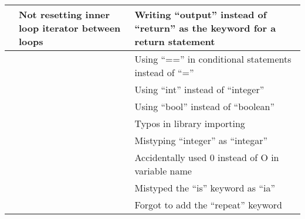 \begin{table}[]
\begin{tabular}{| p{5cm} | p{5cm} | p{5cm} |}
                                                           & Not resetting inner loop iterator between loops                    & Writing “output” instead of “return” as the keyword for a return statement                               \\ \hline
                                                           &                                                                    & Using “==” in conditional statements instead of “=”                                                      \\ \hline
                                                           &                                                                    & Using “int” instead of “integer”                                                                         \\ \hline
                                                           &                                                                    & Using “bool” instead of “boolean”                                                                        \\ \hline
                                                           &                                                                    & Typos in library importing                                                                               \\ \hline
                                                           &                                                                    & Mistyping “integer” as “integar”                                                                         \\ \hline
                                                           &                                                                    & Accidentally used 0 instead of O in variable name                                                        \\ \hline
                                                           &                                                                    & Mistyped the “is” keyword as “ia”                                                                        \\ \hline
                                                           &                                                                    & Forgot to add the “repeat” keyword                                                                       \\ \hline
\end{tabular}
\end{table}

